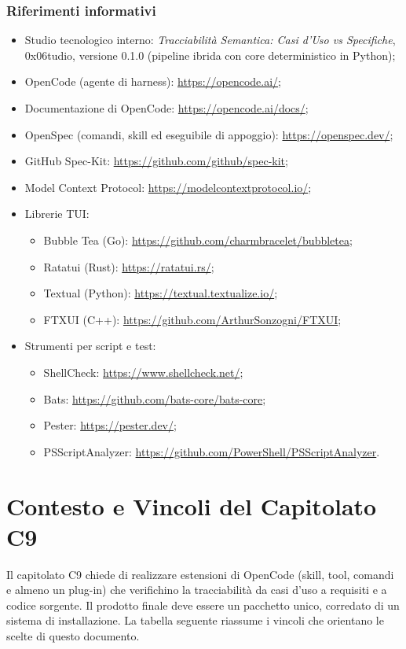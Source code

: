 \documentclass[a4paper, 11pt]{article}
\begin{document}
\subsubsection{Riferimenti informativi}
\begin{itemize}[noitemsep]
    \item Studio tecnologico interno: \textit{Tracciabilità Semantica: Casi d'Uso vs Specifiche}, 0x06tudio, versione 0.1.0 (pipeline ibrida con core deterministico in Python);
    \item OpenCode (agente di harness): \url{https://opencode.ai/};
    \item Documentazione di OpenCode: \url{https://opencode.ai/docs/};
    \item OpenSpec (comandi, skill ed eseguibile di appoggio): \url{https://openspec.dev/};
    \item GitHub Spec-Kit: \url{https://github.com/github/spec-kit};
    \item Model Context Protocol: \url{https://modelcontextprotocol.io/};
    \item Librerie TUI:
    \begin{itemize}[noitemsep]
        \item Bubble Tea (Go): \url{https://github.com/charmbracelet/bubbletea};
        \item Ratatui (Rust): \url{https://ratatui.rs/};
        \item Textual (Python): \url{https://textual.textualize.io/};
        \item FTXUI (C++): \url{https://github.com/ArthurSonzogni/FTXUI};
    \end{itemize}
    \item Strumenti per script e test:
    \begin{itemize}[noitemsep]
        \item ShellCheck: \url{https://www.shellcheck.net/};
        \item Bats: \url{https://github.com/bats-core/bats-core};
        \item Pester: \url{https://pester.dev/};
        \item PSScriptAnalyzer: \url{https://github.com/PowerShell/PSScriptAnalyzer}.
    \end{itemize}
\end{itemize}


\section{Contesto e Vincoli del Capitolato C9}
Il capitolato C9 chiede di realizzare estensioni di OpenCode (skill, tool, comandi e almeno un plug-in) che verifichino la tracciabilità da casi d'uso a requisiti e a codice sorgente. Il prodotto finale deve essere un pacchetto unico, corredato di un sistema di installazione. La tabella seguente riassume i vincoli che orientano le scelte di questo documento.
\end{document}

